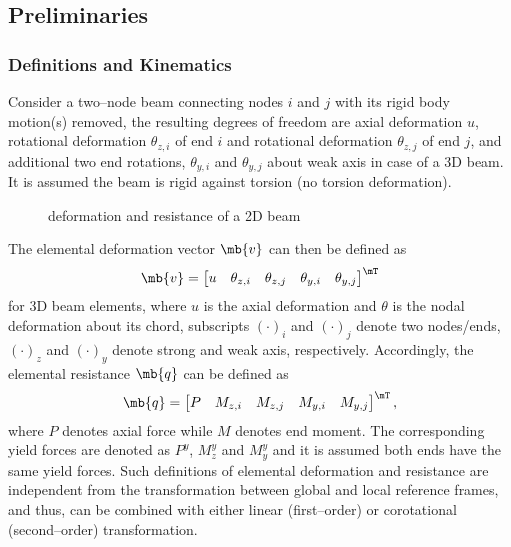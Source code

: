 \subsection{Preliminaries}
\subsubsection{Definitions and Kinematics}
Consider a two--node beam connecting nodes $i$ and $j$ with its rigid body motion(s) removed, the resulting degrees of freedom are axial deformation $u$, rotational deformation $\theta_{z,i}$ of end $i$ and rotational deformation $\theta_{z,j}$ of end $j$, and additional two end rotations, $\theta_{y,i}$ and $\theta_{y,j}$ about weak axis in case of a 3D beam. It is assumed the beam is rigid against torsion (no torsion deformation).
\begin{figure}[H]
\centering
{}
\caption{deformation and resistance of a 2D beam}
\end{figure}

The elemental deformation vector $\mb{v}$ can then be defined as
\begin{gather*}
\mb{v}=\begin{bmatrix}
u&\theta_{z,i}&\theta_{z,j}&\theta_{y,i}&\theta_{y,j}
\end{bmatrix}^\mT
\end{gather*}
for 3D beam elements, where $u$ is the axial deformation and $\theta$ is the nodal deformation about its chord, subscripts $\left(\cdot\right)_i$ and $\left(\cdot\right)_j$ denote two nodes/ends, $\left(\cdot\right)_z$ and $\left(\cdot\right)_y$ denote strong and weak axis, respectively. Accordingly, the elemental resistance $\mb{q}$ can be defined as
\begin{gather}
\mb{q}=\begin{bmatrix}
P&M_{z,i}&M_{z,j}&M_{y,i}&M_{y,j}
\end{bmatrix}^\mT,
\end{gather}
where $P$ denotes axial force while $M$ denotes end moment. The corresponding yield forces are denoted as $P^y$, $M_z^y$ and $M_y^y$ and it is assumed both ends have the same yield forces. Such definitions of elemental deformation and resistance are independent from the transformation between global and local reference frames, and thus, can be combined with either linear (first--order) or corotational (second--order) transformation.

